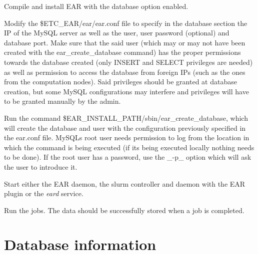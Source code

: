 
\begin{DoxyEnumerate}
\item Compile and install E\+AR with the database option enabled.
\item Modify the \$\+E\+T\+C\+\_\+\+E\+AR/ear/ear.conf file to specify in the database section the IP of the My\+S\+QL server as well as the user, user password (optional) and database port. Make sure that the said user (which may or may not have been created with the ear\+\_\+create\+\_\+database command) has the proper permissions towards the database created (only I\+N\+S\+E\+RT and S\+E\+L\+E\+CT privileges are needed) as well as permission to access the database from foreign I\+Ps (such as the ones from the computation nodes). Said privileges should be granted at database creation, but some My\+S\+QL configurations may interfere and privileges will have to be granted manually by the admin.
\item Run the command \$\+E\+A\+R\+\_\+\+I\+N\+S\+T\+A\+L\+L\+\_\+\+P\+A\+TH/sbin/ear\+\_\+create\+\_\+database, which will create the database and user with the configuration previously specified in the ear.\+conf file. My\+S\+QL\textquotesingle{}s root user needs permission to log from the location in which the command is being executed (if it\textquotesingle{}s being executed locally nothing needs to be done). If the root user has a password, use the \+\_\+-\/p\+\_\+ option which will ask the user to introduce it.
\item Start either the E\+AR daemon, the slurm controller and daemon with the E\+AR plugin or the {\itshape eard} service.
\item Run the jobs. The data should be successfully stored when a job is completed.
\end{DoxyEnumerate}

\section*{Database information}

